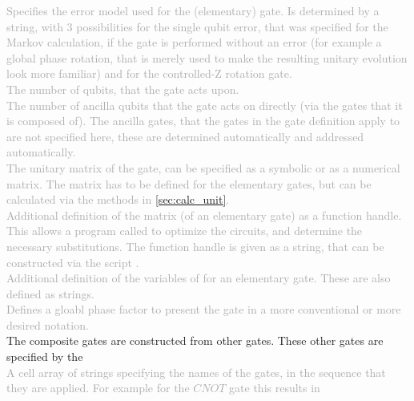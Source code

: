 \textbf{} \textcolor{darkgray}{Specifies the error model used for the (elementary) gate. Is determined by a string, with $3$ possibilities  for the single qubit error, that was specified for the Markov calculation,  if the gate is performed without an error (for example a global phase rotation, that is merely used to make the resulting unitary evolution look more familiar) and  for the controlled-Z rotation gate.}\\

\textbf{} \textcolor{darkgray}{The number of qubits, that the gate acts upon.}\\

\textbf{} \textcolor{darkgray}{The number of ancilla qubits that the gate acts on directly (via the gates that it is composed of). The ancilla gates, that the gates in the gate definition apply to are not specified here, these are determined automatically and addressed automatically. }\\

\textbf{} \textcolor{darkgray}{The unitary matrix of the gate, can be specified as a symbolic or as a numerical matrix. The matrix has to be defined for the elementary gates, but can be calculated via the methods in \ref{sec:calc_unit}. }\\

\textbf{} \textcolor{darkgray}{Additional definition of the matrix (of an elementary gate) as a function handle. This allows a program called  to optimize the circuits, and determine the necessary substitutions. The function handle is given as a string, that can be constructed via the script . }\\

\textbf{} \textcolor{darkgray}{Additional definition of the variables of  for an elementary gate. These are also defined as strings. }\\

\textbf{} \textcolor{darkgray}{Defines a gloabl phase factor to present the gate in a more conventional or more desired notation. }\\

\noindent The composite gates are constructed from other gates. These other gates are specified by the \\

\textbf{}  \textcolor{darkgray}{A cell array of strings specifying the names of the gates, in the sequence that they are applied. For example for the $CNOT$ gate this results in }\\

